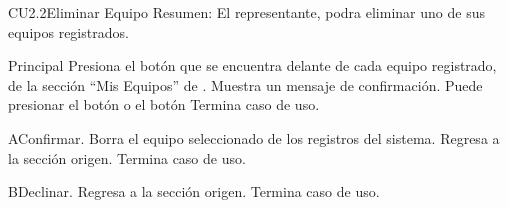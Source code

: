 

	\begin{UseCase}{CU2.2}{Eliminar Equipo}{
		Resumen: El representante, podra eliminar uno de sus equipos registrados.}
	\end{UseCase}
	\newpage
	
	\begin{UCtrayectoria}{Principal}
	\UCpaso[\UCactor] Presiona el botón  que se encuentra delante de cada equipo registrado, de la sección ``Mis Equipos'' de .
	\UCpaso Muestra un mensaje de confirmación.
	\UCpaso[\UCactor]Puede presionar el botón    o el botón  
	\UCpaso Termina caso de uso.
\end{UCtrayectoria}
	
	\begin{UCtrayectoriaA}{A}{Confirmar.}
		\UCpaso Borra el equipo seleccionado de los registros del sistema.
		\UCpaso Regresa a la sección origen.
		\UCpaso Termina caso de uso.
	\end{UCtrayectoriaA}
	
	\begin{UCtrayectoriaA}{B}{Declinar.}
		\UCpaso Regresa a la sección origen.
		\UCpaso Termina caso de uso.
	\end{UCtrayectoriaA}

